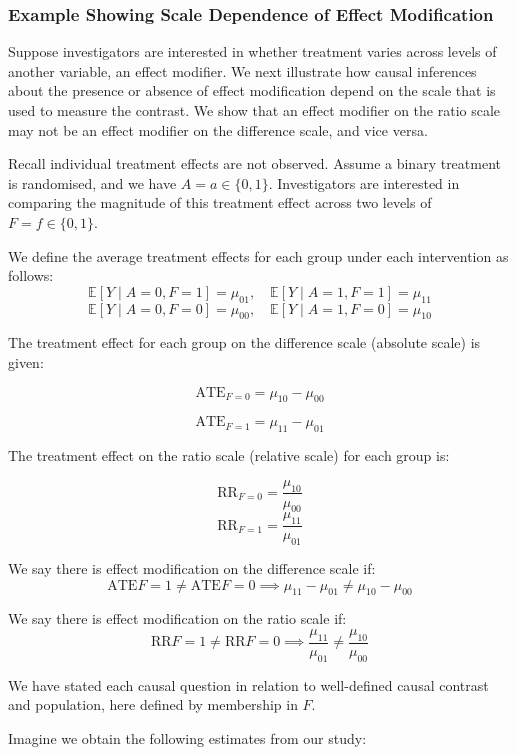 \documentclass[
  single column]{article}
\begin{document}
\subsubsection{Example Showing Scale Dependence of Effect
Modification}\label{example-showing-scale-dependence-of-effect-modification}

Suppose investigators are interested in whether treatment varies across
levels of another variable, an effect modifier. We next illustrate how
causal inferences about the presence or absence of effect modification
depend on the scale that is used to measure the contrast. We show that
an effect modifier on the ratio scale may not be an effect modifier on
the difference scale, and vice versa.

Recall individual treatment effects are not observed. Assume a binary
treatment is randomised, and we have \(A = a \in \{0,1\}\).
Investigators are interested in comparing the magnitude of this
treatment effect across two levels of \(F = f \in \{0,1\}\).

We define the average treatment effects for each group under each
intervention as follows: \[
\mathbb{E}[Y \mid A = 0, F = 1] = \mu_{01}, \quad \mathbb{E}[Y \mid  A = 1, F = 1] = \mu_{11}
\] \[
\mathbb{E}[Y \mid  A = 0, F = 0] = \mu_{00}, \quad \mathbb{E}[Y \mid A = 1, F = 0] = \mu_{10}
\]

The treatment effect for each group on the difference scale (absolute
scale) is given:

\[
\text{ATE}_{F = 0} = \mu_{10} - \mu_{00}
\]

\[
\text{ATE}_{F = 1} = \mu_{11} - \mu_{01}
\]

The treatment effect on the ratio scale (relative scale) for each group
is:

\[
\text{RR}_{F = 0} = \frac{\mu_{10}}{\mu_{00}}
\] \[
\text{RR}_{F = 1} = \frac{\mu_{11}}{\mu_{01}}
\]

We say there is effect modification on the difference scale if: \[
\text{ATE}{F = 1} \neq \text{ATE}{F = 0} \implies \mu_{11} - \mu_{01} \neq \mu_{10} - \mu_{00}
\]

We say there is effect modification on the ratio scale if: \[
\text{RR}{F = 1} \neq \text{RR}{F = 0} \implies \frac{\mu_{11}}{\mu_{01}} \neq \frac{\mu_{10}}{\mu_{00}}
\]

We have stated each causal question in relation to well-defined causal
contrast and population, here defined by membership in \(F\).

Imagine we obtain the following estimates from our study:
\end{document}
